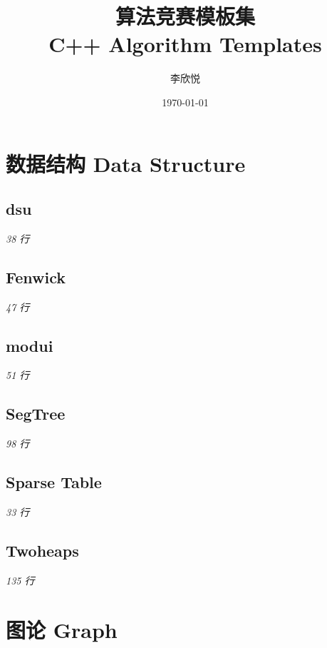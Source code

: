 \documentclass[12pt, UTF8]{ctexart}
\title{\textbf{算法竞赛模板集}\\ \large C++ Algorithm Templates}
\author{李欣悦}
\date{\today}
\begin{document}
\maketitle
\tableofcontents
\newpage
\section{数据结构 Data Structure}

\subsection{dsu}\hfill\normalsize\textit{38 行}



\subsection{Fenwick}\hfill\normalsize\textit{47 行}



\subsection{modui}\hfill\normalsize\textit{51 行}



\subsection{SegTree}\hfill\normalsize\textit{98 行}



\subsection{Sparse Table}\hfill\normalsize\textit{33 行}



\subsection{Twoheaps}\hfill\normalsize\textit{135 行}



\section{图论 Graph}
\end{document}
